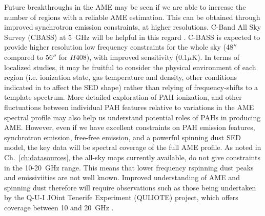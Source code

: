   Future breakthroughs in the AME may be seen if we are able to increase the number of regions with a reliable AME estimation. This can be obtained through improved synchrotron emission constraints, at higher resolutions. C-Band All Sky Survey (CBASS) at 5~GHz will be helpful in this regard \citep{irfan15}. C-BASS is expected to provide higher resolution low frequency constraints for the whole sky (48$''$ compared to 56$''$ for $H408$), with improved sensitivity (0.1$\mu$K). In terms of localized studies, it may be fruitful to consider the physical environment of each region (i.e. ionization state, gas temperature and density, other conditions indicated in \cite{draine98a, ali-haimoud10} to affect the SED shape) rather than relying of frequency-shifts to a template spectrum. More detailed exploration of PAH ionization, and other fluctuations between individual PAH features relative to variations in the AME spectral profile may also help us understand potential roles of PAHs in producing AME. However, even if we have excellent constraints on PAH emission features, synchrotron emission, free-free emission, and a powerful spinning dust SED model, the key data will be spectral coverage of the full AME profile. As noted in Ch.~\ref{ch:datasources}, the all-sky maps currently available, do not give constraints in the 10-20~GHz range. This means that lower frequency rspinning dust peaks and emissiviities are not well known. Improved understanding of AME and spinning dust therefore will require observations such as those being undertaken by the Q-U-I JOint Tenerife Experiment (QUIJOTE) project, which offers coverage between 10 and 20~GHz \citep{santos15}.
